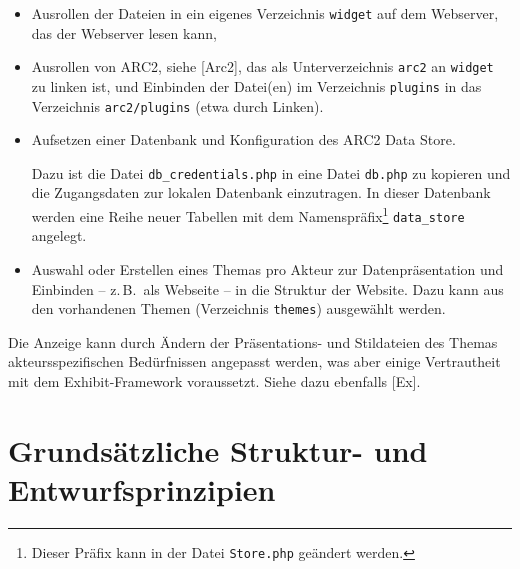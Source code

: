 \documentclass[11pt,a4paper]{article}
\begin{document}
\begin{itemize}
\item Ausrollen der Dateien in ein eigenes Verzeichnis \texttt{widget} auf dem
  Webserver, das der Webserver lesen kann,
\item Ausrollen von ARC2, siehe [Arc2], das als Unterverzeichnis \texttt{arc2}
  an \texttt{widget} zu linken ist, und Einbinden der Datei(en) im Verzeichnis
  \texttt{plugins} in das Verzeichnis \texttt{arc2/plugins} (etwa durch
  Linken).
\item Aufsetzen einer Datenbank und Konfiguration des ARC2 Data Store. 

  Dazu ist die Datei \texttt{db\_credentials.php} in eine Datei
  \texttt{db.php} zu kopieren und die Zugangsdaten zur lokalen Datenbank
  einzutragen. In dieser Datenbank werden eine Reihe neuer Tabellen mit dem
  Namenspräfix\footnote{Dieser Präfix kann in der Datei \texttt{Store.php}
    geändert werden.} \texttt{data\_store} angelegt.
\item Auswahl oder Erstellen eines Themas pro Akteur zur Datenpräsentation und
  Einbinden -- z.\,B.\ als Webseite -- in die Struktur der Website.  Dazu kann
  aus den vorhandenen Themen (Verzeichnis \texttt{themes}) ausgewählt werden. 
\end{itemize}
Die Anzeige kann durch Ändern der Präsentations- und Stildateien des Themas
akteurs\-spezifischen Bedürfnissen angepasst werden, was aber einige
Vertrautheit mit dem Exhibit-Framework voraussetzt.  Siehe dazu ebenfalls
[Ex].

\section{Grundsätzliche Struktur- und Entwurfsprinzipien}
\end{document}

